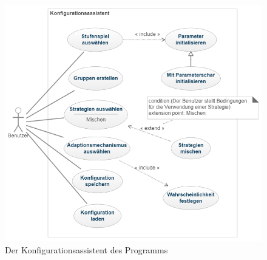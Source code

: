 \begin{figure}[htbp]
{\centering
\includegraphics[width=1.0\textwidth]{Anwendungsfalldiagramme/usecase_config.png}
\caption{Der Konfigurationsassistent des Programms} }
\bigskip

\end{figure}